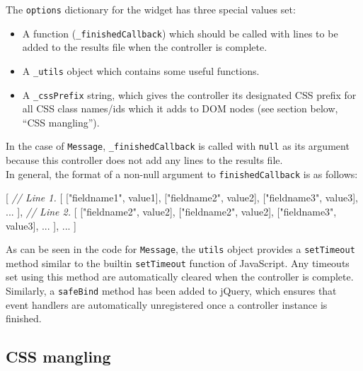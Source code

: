 \documentclass[]{article}
\newenvironment{Shaded}{}{}
\newcommand{\StringTok}[1]{\textcolor[rgb]{0.25,0.44,0.63}{{#1}}}
\newcommand{\CommentTok}[1]{\textcolor[rgb]{0.38,0.63,0.69}{\textit{{#1}}}}
\newcommand{\NormalTok}[1]{{#1}}
\begin{document}
The \texttt{options} dictionary for the widget has three special values
set:

\begin{itemize}
\itemsep1pt\parskip0pt
\item
  A function (\texttt{\_finishedCallback}) which should be called with
  lines to be added to the results file when the controller is complete.
\item
  A \texttt{\_utils} object which contains some useful functions.
\item
  A \texttt{\_cssPrefix} string, which gives the controller its
  designated CSS prefix for all CSS class names/ids which it adds to DOM
  nodes (see section below, ``CSS mangling'').
\end{itemize}

In the case of \texttt{Message}, \texttt{\_finishedCallback} is called
with \texttt{null} as its argument\\because this controller does not add
any lines to the results file.\\In general, the format of a non-null
argument to \texttt{finishedCallback} is as follows:

\begin{Shaded}
\begin{Highlighting}[]
    \NormalTok{[}
        \CommentTok{// Line 1.}
        \NormalTok{[ [}\StringTok{"fieldname1"}\NormalTok{, value1], [}\StringTok{"fieldname2"}\NormalTok{, value2], [}\StringTok{"fieldname3"}\NormalTok{, value3], ... ],}
        \CommentTok{// Line 2.}
        \NormalTok{[ [}\StringTok{"fieldname2"}\NormalTok{, value2], [}\StringTok{"fieldname2"}\NormalTok{, value2], [}\StringTok{"fieldname3"}\NormalTok{, value3], ... ],}
        \NormalTok{...}
    \NormalTok{]}
\end{Highlighting}
\end{Shaded}

As can be seen in the code for \texttt{Message}, the \texttt{utils}
object provides a \texttt{setTimeout} method similar to the builtin
\texttt{setTimeout} function of JavaScript. Any timeouts set using this
method are automatically cleared when the controller is complete.
Similarly, a \texttt{safeBind} method has been added to jQuery, which
ensures that event handlers are automatically unregistered once a
controller instance is finished.

\subsection{CSS mangling}\label{css-mangling}
\end{document}
